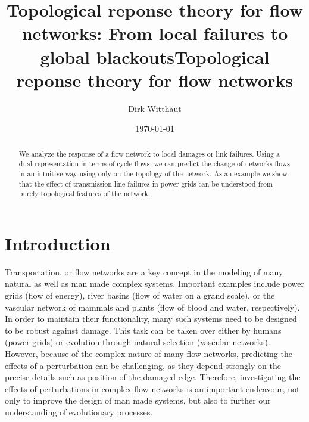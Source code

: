 \documentclass[10pt,aps,pra,twocolumn,superscriptaddress]{revtex4-1}
\begin{document}

\title{Topological reponse theory for flow networks: From local failures to global blackouts}
\title{Topological reponse theory for flow networks}

\author{Dirk Witthaut}


\date{\today }


\begin{abstract}
We analyze the response of a flow network to local damages or link failures. Using a dual representation in terms of cycle flows, we can predict the change of networks flows in an intuitive way using only on the topology of the network. As an example we show that the effect of transmission line failures in power grids can be understood from purely topological features of the network. 
\end{abstract}


\maketitle


\section{Introduction}
Transportation, or flow networks are a key concept in the modeling
of many natural as well as man made complex systems. Important
examples include power grids (flow of energy), river basins (flow
of water on a grand scale), or the vascular network of mammals
and plants (flow of blood and water, respectively).
In order to maintain their functionality, many such systems need
to be designed to be robust against damage. This task can be taken
over either by humans (power grids) or evolution through natural
selection (vascular networks).
However, because of the complex nature of many flow networks,
predicting the effects of a perturbation can be challenging, as they
depend strongly on the precise details such as position of the damaged
edge.
Therefore, investigating the effects of perturbations in complex flow
networks is an important endeavour, not only to improve the design
of man made systems, but also to further our understanding of
evolutionary processes.
\end{document}
